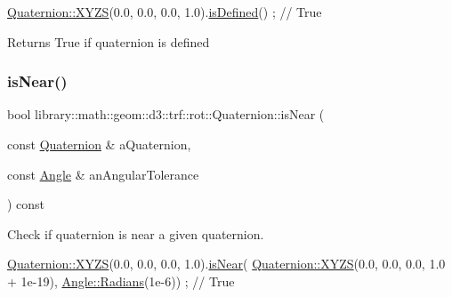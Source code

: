 \begin{DoxyCode}
\hyperlink{classlibrary_1_1math_1_1geom_1_1d3_1_1trf_1_1rot_1_1_quaternion_a006294eb483bcfc352c2dc36cf19ceec}{Quaternion::XYZS}(0.0, 0.0, 0.0, 1.0).\hyperlink{classlibrary_1_1math_1_1geom_1_1d3_1_1trf_1_1rot_1_1_quaternion_adf3d76908b0b95dc3a0310de17ba18b5}{isDefined}() ; \textcolor{comment}{// True}
\end{DoxyCode}


\begin{DoxyReturn}{Returns}
True if quaternion is defined 
\end{DoxyReturn}
\mbox{\label{classlibrary_1_1math_1_1geom_1_1d3_1_1trf_1_1rot_1_1_quaternion_ac335110e3bc152b22d76a2e980242619}} 
\subsubsection{\texorpdfstring{is\+Near()}{isNear()}}
{\footnotesize\ttfamily bool library\+::math\+::geom\+::d3\+::trf\+::rot\+::\+Quaternion\+::is\+Near (\begin{DoxyParamCaption}\item[{const \hyperlink{classlibrary_1_1math_1_1geom_1_1d3_1_1trf_1_1rot_1_1_quaternion}{Quaternion} \&}]{a\+Quaternion,  }\item[{const \hyperlink{classlibrary_1_1math_1_1geom_1_1_angle}{Angle} \&}]{an\+Angular\+Tolerance }\end{DoxyParamCaption}) const}



Check if quaternion is near a given quaternion. 


\begin{DoxyCode}
\hyperlink{classlibrary_1_1math_1_1geom_1_1d3_1_1trf_1_1rot_1_1_quaternion_a006294eb483bcfc352c2dc36cf19ceec}{Quaternion::XYZS}(0.0, 0.0, 0.0, 1.0).\hyperlink{classlibrary_1_1math_1_1geom_1_1d3_1_1trf_1_1rot_1_1_quaternion_ac335110e3bc152b22d76a2e980242619}{isNear}(
      \hyperlink{classlibrary_1_1math_1_1geom_1_1d3_1_1trf_1_1rot_1_1_quaternion_a006294eb483bcfc352c2dc36cf19ceec}{Quaternion::XYZS}(0.0, 0.0, 0.0, 1.0 + 1e-19), \hyperlink{classlibrary_1_1math_1_1geom_1_1_angle_a9f4a8ad6bfe63060c86c0f1fb2753cf7}{Angle::Radians}(1e-6)) ; \textcolor{comment}{// True}
\end{DoxyCode}



